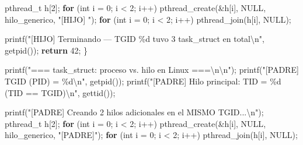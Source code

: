 \documentclass[
  spanish,
]{article}
\newenvironment{Shaded}{}{}
\newcommand{\ControlFlowTok}[1]{\textcolor[rgb]{0.00,0.44,0.13}{\textbf{#1}}}
\newcommand{\DataTypeTok}[1]{\textcolor[rgb]{0.56,0.13,0.00}{#1}}
\newcommand{\DecValTok}[1]{\textcolor[rgb]{0.25,0.63,0.44}{#1}}
\newcommand{\NormalTok}[1]{#1}
\newcommand{\OperatorTok}[1]{\textcolor[rgb]{0.40,0.40,0.40}{#1}}
\newcommand{\SpecialCharTok}[1]{\textcolor[rgb]{0.25,0.44,0.63}{#1}}
\newcommand{\StringTok}[1]{\textcolor[rgb]{0.25,0.44,0.63}{#1}}
\begin{document}
\begin{Shaded}
\begin{Highlighting}[]
\NormalTok{        pthread\_t h}\OperatorTok{[}\DecValTok{2}\OperatorTok{];}
        \ControlFlowTok{for} \OperatorTok{(}\DataTypeTok{int}\NormalTok{ i }\OperatorTok{=} \DecValTok{0}\OperatorTok{;}\NormalTok{ i }\OperatorTok{\textless{}} \DecValTok{2}\OperatorTok{;}\NormalTok{ i}\OperatorTok{++)}
\NormalTok{            pthread\_create}\OperatorTok{(\&}\NormalTok{h}\OperatorTok{[}\NormalTok{i}\OperatorTok{],}\NormalTok{ NULL}\OperatorTok{,}\NormalTok{ hilo\_generico}\OperatorTok{,} \StringTok{"[HIJO] "}\OperatorTok{);}
        \ControlFlowTok{for} \OperatorTok{(}\DataTypeTok{int}\NormalTok{ i }\OperatorTok{=} \DecValTok{0}\OperatorTok{;}\NormalTok{ i }\OperatorTok{\textless{}} \DecValTok{2}\OperatorTok{;}\NormalTok{ i}\OperatorTok{++)}
\NormalTok{            pthread\_join}\OperatorTok{(}\NormalTok{h}\OperatorTok{[}\NormalTok{i}\OperatorTok{],}\NormalTok{ NULL}\OperatorTok{);}

\NormalTok{        printf}\OperatorTok{(}\StringTok{"[HIJO]  Terminando — TGID }\SpecialCharTok{\%d}\StringTok{ tuvo 3 task\_struct en total}\SpecialCharTok{\textbackslash{}n}\StringTok{"}\OperatorTok{,}\NormalTok{ getpid}\OperatorTok{());}
        \ControlFlowTok{return} \DecValTok{42}\OperatorTok{;}
    \OperatorTok{\}}

\NormalTok{    printf}\OperatorTok{(}\StringTok{"=== task\_struct: proceso vs. hilo en Linux ===}\SpecialCharTok{\textbackslash{}n\textbackslash{}n}\StringTok{"}\OperatorTok{);}
\NormalTok{    printf}\OperatorTok{(}\StringTok{"[PADRE] TGID (PID) = }\SpecialCharTok{\%d\textbackslash{}n}\StringTok{"}\OperatorTok{,}\NormalTok{ getpid}\OperatorTok{());}
\NormalTok{    printf}\OperatorTok{(}\StringTok{"[PADRE]   Hilo principal: TID = }\SpecialCharTok{\%d}\StringTok{  (TID == TGID)}\SpecialCharTok{\textbackslash{}n}\StringTok{"}\OperatorTok{,}\NormalTok{ gettid}\OperatorTok{());}

\NormalTok{    printf}\OperatorTok{(}\StringTok{"[PADRE] Creando 2 hilos adicionales en el MISMO TGID...}\SpecialCharTok{\textbackslash{}n}\StringTok{"}\OperatorTok{);}
\NormalTok{    pthread\_t h}\OperatorTok{[}\DecValTok{2}\OperatorTok{];}
    \ControlFlowTok{for} \OperatorTok{(}\DataTypeTok{int}\NormalTok{ i }\OperatorTok{=} \DecValTok{0}\OperatorTok{;}\NormalTok{ i }\OperatorTok{\textless{}} \DecValTok{2}\OperatorTok{;}\NormalTok{ i}\OperatorTok{++)}
\NormalTok{        pthread\_create}\OperatorTok{(\&}\NormalTok{h}\OperatorTok{[}\NormalTok{i}\OperatorTok{],}\NormalTok{ NULL}\OperatorTok{,}\NormalTok{ hilo\_generico}\OperatorTok{,} \StringTok{"[PADRE]"}\OperatorTok{);}
    \ControlFlowTok{for} \OperatorTok{(}\DataTypeTok{int}\NormalTok{ i }\OperatorTok{=} \DecValTok{0}\OperatorTok{;}\NormalTok{ i }\OperatorTok{\textless{}} \DecValTok{2}\OperatorTok{;}\NormalTok{ i}\OperatorTok{++)}
\NormalTok{        pthread\_join}\OperatorTok{(}\NormalTok{h}\OperatorTok{[}\NormalTok{i}\OperatorTok{],}\NormalTok{ NULL}\OperatorTok{);}


\end{Highlighting}
\end{Shaded}
\end{document}
